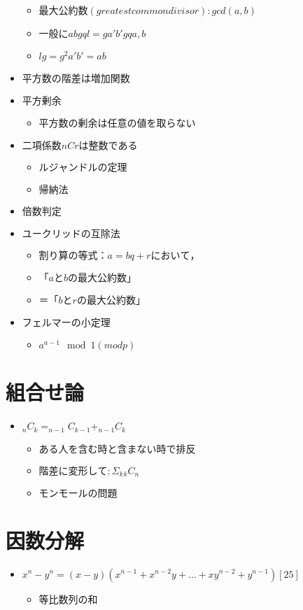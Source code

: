 \documentclass[dvipdfmx,uplatex]{jsarticle}
\begin{document}
\begin{itemize}
\begin{itemize}
		\item $ 最大公約数(greatest common divisor): gcd(a,b)$
		\item $ 一般に ab gq l = ga'b' gq a, b$
		\item $ lg = g^2a'b' = ab$
	\end{itemize}
	\item $ 平方数の階差は増加関数$
	\item $ 平方剰余$
	\begin{itemize}
		\item $ 平方数の剰余は任意の値を取らない$
	\end{itemize}
	\item $ 二項係数nCrは整数である$
	\begin{itemize}
		\item $ ルジャンドルの定理$
		\item $ 帰納法$
	\end{itemize}
	\item $ 倍数判定$
	\item $ ユークリッドの互除法$
	\begin{itemize}
		\item $ 割り算の等式：a=bq+r において，$
		\item $ 「a と b の最大公約数」$
		\item $ ＝「b と r の最大公約数」$
	\end{itemize}
	\item $ フェルマーの小定理$
	\begin{itemize}
		\item $ a^{a-1} \mod 1 (mod p)$
	\end{itemize}
\end{itemize}

\section{組合せ論}
\begin{itemize}
	\item $ _nC_k = _{n-1}C_{k-1} + _{n-1}C_{k}$
	\begin{itemize}
		\item $ ある人を含む時と含まない時で排反$
		\item $ 階差に変形して: Σ_k {}_k C_n$
		\item $ モンモールの問題$
	\end{itemize}
\end{itemize}

\section{因数分解}
\begin{itemize}
	\item $ x^n - y^n = (x - y)(x^{n - 1} + x^{n - 2}y + … + xy^{n - 2} + y^{n - 1}) [25]$
	\begin{itemize}
		\item $ 等比数列の和$
	\end{itemize}
\end{itemize}
\end{document}
